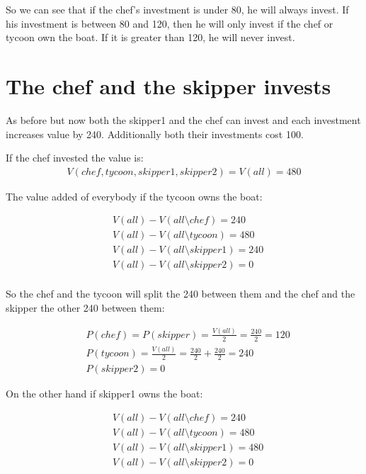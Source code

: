 \documentclass[12pt]{report}
\numberwithin{equation}{section}
\begin{document}
So we can see that if the chef's investment is under 80, he will always invest. If his investment is between 80 and 120, then he will only invest if the chef or tycoon own the boat. If it is greater than 120, he will never invest. 

\section{The chef and the skipper invests}


As before but now both the skipper1 and the chef can invest and each investment increases value by 240. Additionally both their investments cost 100. 

If the chef invested the value is:
\begin{align*}
V(chef,tycoon,skipper1, skipper2) = V(all)= 480
\end{align*}

The value added of everybody if the tycoon owns the boat:

\begin{align*}
& V(all)-V(all \setminus chef)= 240 \\
& V(all)-V(all \setminus tycoon) = 480 \\
& V(all)-V(all \setminus skipper1)= 240 \\
& V(all)-V(all \setminus skipper2) = 0 \\
\end{align*}

So the chef and the tycoon will split the 240 between them and the chef and the skipper the other 240 between them:

\begin{align*}
& P(chef)=P(skipper) = \frac{V(all)}{2}=\frac{240}{2} =120 \\
& P(tycoon) = \frac{V(all)}{2}=\frac{240}{2}+\frac{240}{2} =240 \\
& P(skipper2)=0
\end{align*}

On the other hand if skipper1 owns the boat: 

\begin{align*}
&V(all)-V(all \setminus chef)= 240 \\
&V(all)-V(all \setminus tycoon)= 480  \\
&V(all)-V(all \setminus skipper1)= 480 \\
&V(all)-V(all \setminus skipper2) = 0 \\
\end{align*}
\end{document}

